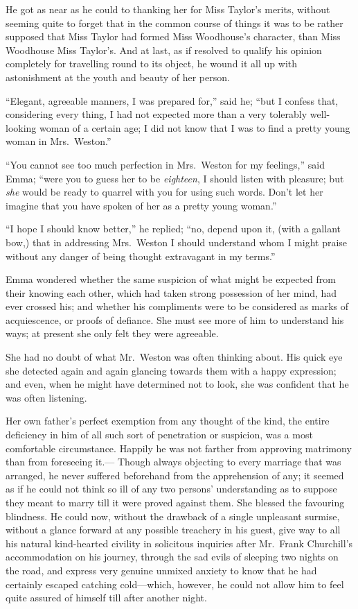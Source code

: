 He got as near as he could to thanking her for Miss Taylor's merits,
without seeming quite to forget that in the common course of things it
was to be rather supposed that Miss Taylor had formed Miss Woodhouse's
character, than Miss Woodhouse Miss Taylor's. And at last, as if resolved
to qualify his opinion completely for travelling round to its object, he
wound it all up with astonishment at the youth and beauty of her person.

``Elegant, agreeable manners, I was prepared for,'' said he;
``but I confess that, considering every thing, I had not expected
more than a very tolerably well-looking woman of a certain age;
I did not know that I was to find a pretty young woman in Mrs.\ Weston.''

``You cannot see too much perfection in Mrs.\ Weston for my feelings,''
said Emma; ``were you to guess her to be \emph{eighteen}, I should listen
with pleasure; but \emph{she} would be ready to quarrel with you for using
such words.  Don't let her imagine that you have spoken of her as
a pretty young woman.''

``I hope I should know better,'' he replied; ``no, depend upon it,
(with a gallant bow,) that in addressing Mrs.\ Weston I should
understand whom I might praise without any danger of being thought
extravagant in my terms.''

Emma wondered whether the same suspicion of what might be expected
from their knowing each other, which had taken strong possession
of her mind, had ever crossed his; and whether his compliments were
to be considered as marks of acquiescence, or proofs of defiance.
She must see more of him to understand his ways; at present she
only felt they were agreeable.

She had no doubt of what Mr.\ Weston was often thinking about.
His quick eye she detected again and again glancing towards them
with a happy expression; and even, when he might have determined not
to look, she was confident that he was often listening.

Her own father's perfect exemption from any thought of the kind,
the entire deficiency in him of all such sort of penetration
or suspicion, was a most comfortable circumstance.  Happily he
was not farther from approving matrimony than from foreseeing it.---%
Though always objecting to every marriage that was arranged,
he never suffered beforehand from the apprehension of any;
it seemed as if he could not think so ill of any two persons'
understanding as to suppose they meant to marry till it were
proved against them.  She blessed the favouring blindness.
He could now, without the drawback of a single unpleasant surmise,
without a glance forward at any possible treachery in his guest,
give way to all his natural kind-hearted civility in solicitous
inquiries after Mr.\ Frank Churchill's accommodation on his journey,
through the sad evils of sleeping two nights on the road, and express
very genuine unmixed anxiety to know that he had certainly escaped
catching cold---which, however, he could not allow him to feel quite
assured of himself till after another night.

